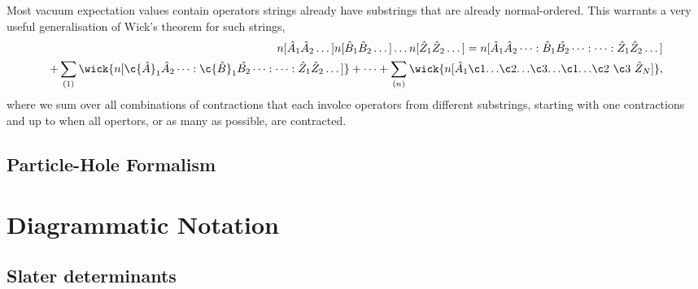 		Most vacuum expectation values contain operators strings already have substrings
		that are already normal-ordered. This warrants a very useful generalisation of
		Wick's theorem for such strings,
		\begin{equation}
			\begin{aligned}
			n[\hat{A}_1\hat{A}_2 \dots ]
			n[\hat{B}_1\hat{B}_2 \dots ] \dots
			n[\hat{Z}_1\hat{Z}_2 \dots ]
			= n[\hat{A}_1\hat{A}_2\dots:
				\hat{B}_1\hat{B_2}\dots:
				\dots:
				\hat{Z}_1\hat{Z}_2\dots] \\
			+ \sum_{(1)}
				\wick{n[
				\c{\hat{A}}_1\hat{A}_2\dots:
				\c{\hat{B}}_1\hat{B_2}\dots:
				\dots:
				\hat{Z}_1\hat{Z}_2\dots]}
			+ \dots 
			+ \sum_{(n)}
				\wick{n[		
				\hat{A}_1 \c1{\dots} \c2{\dots} \c3{\dots} 
					\c1{\dots} \c2{\ } \c3{\ } \hat{Z}_N
				]},
			\end{aligned}
		\end{equation}
		where we sum over all combinations of contractions that each involce operators 
		from different substrings, starting with one contractions and up to when all
		opertors, or as many as possible, are contracted.

    \subsection{Particle-Hole Formalism}

\section{Diagrammatic Notation}
    \subsection{Slater determinants}
	
